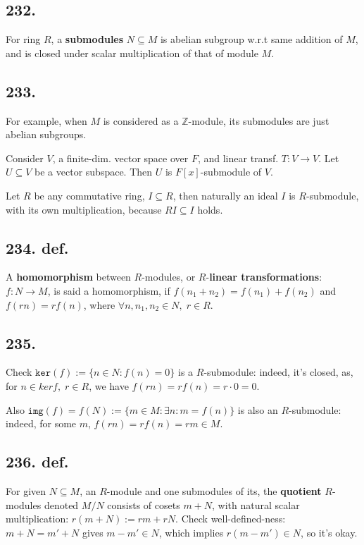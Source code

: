 \documentclass[12pt]{article}
\newcommand{\M}\cdot%
\newcommand{\Ev}\forall%
\newcommand{\Ex}\exists%
\newcommand{\Ar}\rightarrow%
\newcommand{\BF}[1]{ \mathbb{#1} }%
\newcommand{\Ss}[1]{\textsf{\bfseries{#1}}}%
\newcommand{\Tw}[1]{\texttt{#1}}%
\begin{document}
\subsection*{232.} For ring \(R\), a \Ss{submodules} \(N \subseteq M\) is abelian subgroup w.r.t same addition of \(M\), and is closed under scalar multiplication of that of module \(M\). 

\subsection*{233.} For example, when \(M\) is considered as a \(\BF{Z}\)-module, its submodules are just abelian subgroups. \par
Consider \(V\), a finite-dim. vector space over \(F\), and linear transf. \(T:V\Ar V\). 
Let \(U \subseteq V\) be a vector subspace. Then \(U\) is \(F[x]\)-submodule of \(V\). \par
Let \(R\) be any commutative ring, \(I \subseteq R\), then naturally an ideal \(I\) is \(R\)-submodule, with its own multiplication, because \(RI \subseteq I\) holds. 

\subsection*{234. def.} A \Ss{homomorphism} between \(R\)-modules, or \(R\)-\Ss{linear transformations}: \(f: N \Ar M\), is said a homomorphism, if \(f(n_1+n_2) =f(n_1)+f(n_2)\) and \(f(rn) =rf(n)\), where \(\Ev n,n_1,n_2 \in N,\; r \in R\). 

\subsection*{235.} Check \(\Tw{ker}(f):= \{n \in N: f(n) =0\}\) is a \(R\)-submodule: indeed, it's closed, as, for \(n \in ker f,\; r \in R\), we have \(f(rn) =rf(n) =r \M 0 =0\). \par
Also \(\Tw{img}(f) =f(N) := \{m \in M: \Ex n: m =f(n)\}\) is also an \(R\)-submodule: indeed, for some \(m\), \(f(rn) =rf(n) =rm \in M\). 

\subsection*{236. def.} For given \(N \subseteq M\), an \(R\)-module and one submodules of its, the \Ss{quotient} \(R\)-modules denoted \(M/N\) consists of cosets \(m+N\), with natural scalar multiplication: \(r(m+N) := rm+rN\). 
Check well-defined-ness: \(m+N =m'+N\) gives \(m-m' \in N\), which implies \(r(m-m') \in N\), so it's okay.
\end{document}
